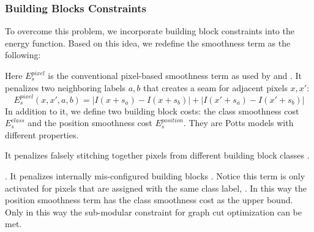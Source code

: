 \documentclass{acmtog}
\begin{document}
\subsubsection{Building Blocks Constraints}

To overcome this problem, we incorporate building block constraints into the energy function.  Based on this idea, we redefine the smoothness term as the following:


Here $E_{s}^{pixel}$ is the conventional pixel-based smoothness term as used by \cite{Pritch09ICCV} and \cite{He2012PO}. It penalizes two neighboring labels $a, b$ that creates a seam for adjacent pixels $x, x'$:
%
\begin{equation}
E_{s}^{pixel}(x, x', a, b) = |I(x + s_{a}) - I(x + s_{b})| + |I(x' + s_{a}) - I(x' + s_{b})|
\label{eq:ESmooth}
\end{equation}
%
In addition to it, we define two building block costs: the class smoothness cost $E_{s}^{class}$ and the position smoothness cost $E_{s}^{position}$. They are Potts models with different properties. 

 It penalizes falsely stitching together pixels from different building block classes .  

. It penalizes internally mis-configured building blocks . Notice this term is only activated for pixels that are assigned with the same class label, . In this way the position smoothness term has the class smoothness cost as the upper bound. Only in this way the sub-modular constraint for graph cut optimization \cite{BOYKOVpami2001} can be met.
\end{document}
